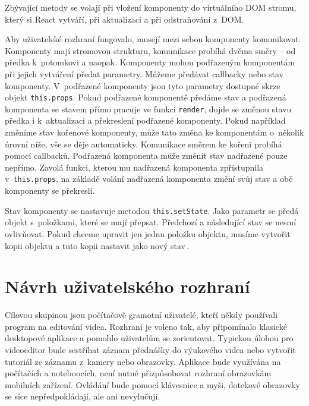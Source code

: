 Zbývající metody se volají při vložení komponenty do virtuálního DOM stromu, který si React vytváří, při aktualizaci a při odstraňování z~DOM.

Aby uživatelské rozhraní fungovalo, musejí mezi sebou komponenty komunikovat. Komponenty mají stromovou strukturu, komunikace probíhá dvěma směry -- od předka k~potomkovi a naopak. Komponenty mohou podřazeným komponentám při jejich vytváření předat parametry. Můžeme předávat callbacky nebo stav komponenty. V~podřazené komponenty jsou tyto parametry dostupné skrze objekt \texttt{this.props}. Pokud podřazené komponentě předáme stav a podřazená komponenta se stavem přímo pracuje ve funkci \texttt{render}, dojde se změnou stavu předka i k~aktualizaci a překreslení podřazené komponenty. Pokud například změníme stav kořenové komponenty, může tato změna  ke komponentám o~několik úrovní níže, vše se děje automaticky. Komunikace směrem ke kořeni probíhá pomocí callbacků. Podřazená komponenta může změnit stav nadřazené pouze nepřímo. Zavolá funkci, kterou mu nadřazená komponenta zpřístupnila v~\texttt{this.props}, na základě volání nadřazená komponenta změní svůj stav a obě komponenty se překreslí.

Stav komponenty se nastavuje metodou \texttt{this.setState}. Jako parametr se předá objekt s~položkami, které se mají přepsat. Předchozí a následující stav se nesmí ovlivňovat. Pokud chceme upravit jen jednu položku objektu, musíme vytvořit kopii objektu a tuto kopii nastavit jako nový stav\,\cite{react}.

\section{Návrh uživatelského rozhraní}
Cílovou skupinou jsou počítačově gramotní uživatelé, kteří někdy používali program na editování videa. Rozhraní je voleno tak, aby připomínalo klasické desktopové aplikace a pomohlo uživatelům se zorientovat. Typickou úlohou pro videoeditor bude sestříhat záznam přednášky do výukového videa nebo vytvořit tutoriál ze záznamu z~kamery nebo obrazovky. Aplikace bude využívána na počítačích a noteboocích, není nutné přizpůsobovat rozhraní obrazovkám mobilních zařízení. Ovládání bude pomocí klávesnice a myši, dotekové obrazovky se sice nepředpokládají, ale ani nevylučují.

